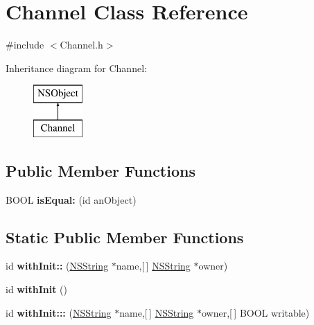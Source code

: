 \hypertarget{interface_channel}{
\section{\-Channel \-Class \-Reference}
\label{interface_channel}
}


{\ttfamily \#include $<$\-Channel.\-h$>$}

\-Inheritance diagram for \-Channel\-:\begin{figure}[H]
\begin{center}
\leavevmode
\includegraphics[height=2.000000cm]{interface_channel}
\end{center}
\end{figure}
\subsection*{\-Public \-Member \-Functions}
\begin{DoxyCompactItemize}
\item 
\hypertarget{interface_channel_ad8953282a8deae8579e0f293429424e9}{
\-B\-O\-O\-L {\bfseries is\-Equal\-:} (id an\-Object)}
\label{interface_channel_ad8953282a8deae8579e0f293429424e9}

\end{DoxyCompactItemize}
\subsection*{\-Static \-Public \-Member \-Functions}
\begin{DoxyCompactItemize}
\item 
\hypertarget{interface_channel_abe225600e78759a3765c5a5af891b4ca}{
id {\bfseries with\-Init\-::} (\hyperlink{class_n_s_string}{\-N\-S\-String} $\ast$name,\mbox{[}$\,$\mbox{]} \hyperlink{class_n_s_string}{\-N\-S\-String} $\ast$owner)}
\label{interface_channel_abe225600e78759a3765c5a5af891b4ca}

\item 
\hypertarget{interface_channel_a0aab206e239acdec6d50bd8e328934ba}{
id {\bfseries with\-Init} ()}
\label{interface_channel_a0aab206e239acdec6d50bd8e328934ba}

\item 
\hypertarget{interface_channel_a8c36d05ce985b19155c3a873a0c1ba43}{
id {\bfseries with\-Init\-:::} (\hyperlink{class_n_s_string}{\-N\-S\-String} $\ast$name,\mbox{[}$\,$\mbox{]} \hyperlink{class_n_s_string}{\-N\-S\-String} $\ast$owner,\mbox{[}$\,$\mbox{]} \-B\-O\-O\-L writable)}
\label{interface_channel_a8c36d05ce985b19155c3a873a0c1ba43}

\end{DoxyCompactItemize}
